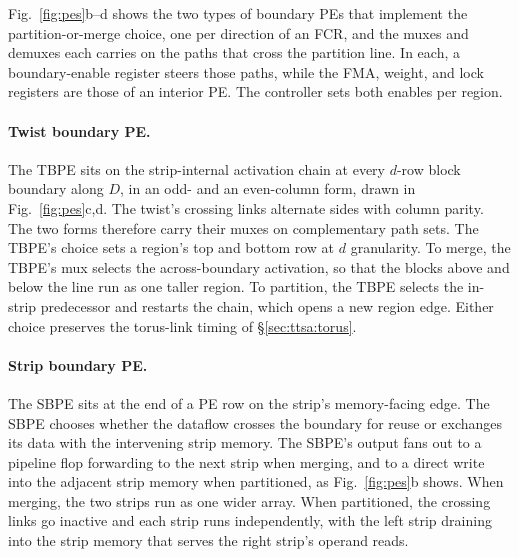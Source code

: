 

Fig.~\ref{fig:pes}b--d shows the two types of
boundary PEs that implement the partition-or-merge choice, one per
direction of an FCR, and the muxes and demuxes each
carries on the paths that cross the partition line. In each, a
boundary-enable register steers those paths, while the FMA, weight, and lock registers are those of an interior PE. The
controller sets both enables per region.

\paragraph{Twist boundary PE.}
The TBPE sits on the strip-internal activation chain at
every $d$-row block boundary along $D$, in an odd- and an even-column
form, drawn in Fig.~\ref{fig:pes}c,d. The twist's crossing links
alternate sides with column parity. The two forms therefore carry
their muxes on complementary path sets. The TBPE's choice sets a region's top
and bottom row at $d$ granularity. To merge, the TBPE's mux selects the
across-boundary activation, so that the blocks above and below the line
run as one taller region. To partition, the TBPE selects the in-strip predecessor
and restarts the chain, which opens a new region edge. Either choice
preserves the torus-link timing of \S\ref{sec:ttsa:torus}.

\paragraph{Strip boundary PE.}
The SBPE sits at the end of a PE row on the strip's
memory-facing edge. The SBPE chooses whether the dataflow crosses the
boundary for reuse or exchanges its data with the intervening
strip memory.
The SBPE's output fans out to a pipeline flop forwarding to the next strip when
merging, and to a direct write into the adjacent strip memory when
partitioned, as Fig.~\ref{fig:pes}b shows. When merging, the two strips run
as one wider array. When partitioned, the crossing links go inactive and each
strip runs independently, with the left strip draining into the strip
memory that serves the right strip's operand reads.

